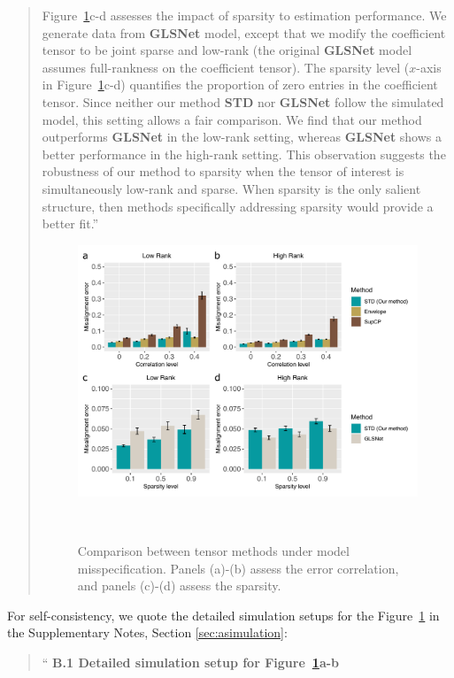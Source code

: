 \documentclass[11pt]{article}
\theoremstyle{plain}
\theoremstyle{definition}
\begin{document}
\begin{enumerate}[wide, labelwidth=!, labelindent=0pt]
\begin{enumerate}[wide, labelwidth=!, labelindent=0pt]
\begin{quote}
Figure~\ref{fig:noniid}c-d assesses the impact of sparsity to estimation performance. We generate data from {\bf GLSNet} model, except that we modify the coefficient tensor to be joint sparse and low-rank (the original {\bf GLSNet} model assumes full-rankness on the coefficient tensor). 
The sparsity level ($x$-axis in Figure~\ref{fig:noniid}c-d) quantifies the proportion of zero entries in the coefficient tensor. Since neither our method {\bf STD} nor {\bf GLSNet} follow the simulated model, this setting allows a fair comparison. We find that our method outperforms {\bf GLSNet} in the low-rank setting, whereas {\bf GLSNet} shows a better performance in the high-rank setting. This observation suggests the robustness of our method to sparsity when the tensor of interest is simultaneously low-rank and sparse. When sparsity is the only salient structure, then methods specifically addressing sparsity would provide a better fit.''


\begin{figure}[htb]
\centering
\includegraphics[width=12cm]{noniid_final.pdf} 
\caption{Comparison between tensor methods under model misspecification. Panels (a)-(b) assess the error correlation, and panels (c)-(d) assess the sparsity. }~\label{fig:noniid}
 \end{figure}
 
 \end{quote}
 
 For self-consistency, we quote the detailed simulation setups for the Figure~\ref{fig:noniid} in the Supplementary Notes, Section \ref{sec:asimulation}:
\begin{quote}
    ``
    \textbf{B.1 Detailed simulation setup for Figure~\ref{fig:noniid}a-b}
    

\end{quote}
\end{enumerate}
\end{enumerate}
\end{document}

